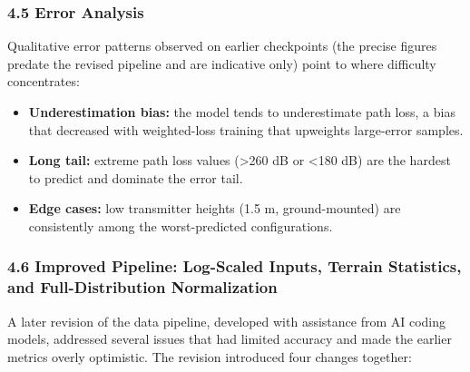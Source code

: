 \documentclass[
]{article}
\providecommand{\tightlist}{%
  \setlength{\itemsep}{0pt}\setlength{\parskip}{0pt}}
\begin{document}
\subsubsection{4.5 Error Analysis}\label{error-analysis}

Qualitative error patterns observed on earlier checkpoints (the precise
figures predate the revised pipeline and are indicative only) point to
where difficulty concentrates:

\begin{itemize}
\tightlist
\item
  \textbf{Underestimation bias:} the model tends to underestimate path
  loss, a bias that decreased with weighted-loss training that upweights
  large-error samples.
\item
  \textbf{Long tail:} extreme path loss values (\textgreater260 dB or
  \textless180 dB) are the hardest to predict and dominate the error
  tail.
\item
  \textbf{Edge cases:} low transmitter heights (1.5 m, ground-mounted)
  are consistently among the worst-predicted configurations.
\end{itemize}

\subsubsection{4.6 Improved Pipeline: Log-Scaled Inputs, Terrain
Statistics, and Full-Distribution
Normalization}\label{improved-pipeline-log-scaled-inputs-terrain-statistics-and-full-distribution-normalization}

A later revision of the data pipeline, developed with assistance from AI
coding models, addressed several issues that had limited accuracy and
made the earlier metrics overly optimistic. The revision introduced four
changes together:
\end{document}
